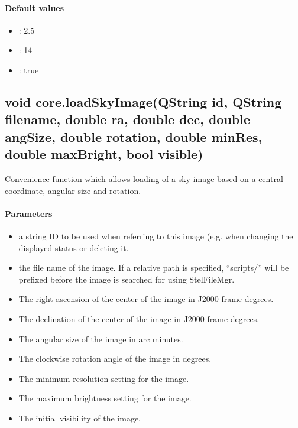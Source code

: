\paragraph{Default values}
\begin{itemize}
\item {}: 2.5
\item {}: 14
\item {}: true
\end{itemize}

\subsection{void core.loadSkyImage(QString id, QString filename, double ra, double dec, double angSize, double rotation, double minRes, double maxBright, bool visible)}
\label{sec:ScriptingAPI:core:loadSkyImage1}
Convenience function which allows loading of a sky image based on a central coordinate, angular size and rotation.

\paragraph{Parameters}
\begin{itemize}
\item {} a string ID to be used when referring to this image (e.g. when changing the displayed status or deleting it.
\item {} the file name of the image. If a relative path is specified, ``scripts/'' will be prefixed before the image is searched for using StelFileMgr.
\item {} The right ascension of the center of the image in J2000 frame degrees.
\item {} The declination of the center of the image in J2000 frame degrees.
\item {} The angular size of the image in arc minutes.
\item {} 	The clockwise rotation angle of the image in degrees.
\item {} The minimum resolution setting for the image.
\item {} The maximum brightness setting for the image.
\item {} The initial visibility of the image.
\end{itemize}

